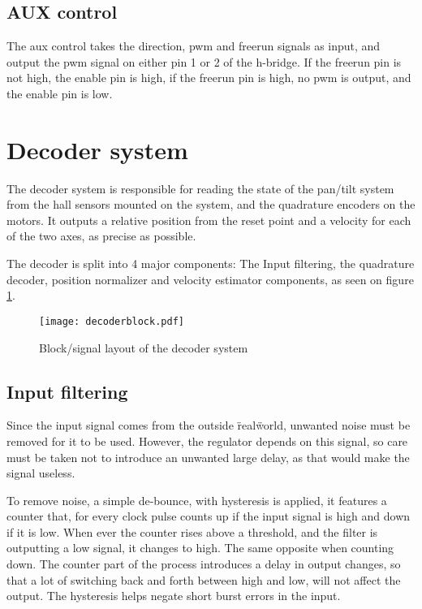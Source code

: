 \subsection{AUX control}
The aux control takes the direction, pwm and freerun signals as input, and output the pwm signal on either pin 1 or 2 of the h-bridge. If the freerun pin is not high, the enable pin is high, if the freerun pin is high, no pwm is output, and the enable pin is low.

\section{Decoder system}
The decoder system is responsible for reading the state of the pan/tilt system from the hall sensors mounted on the system, and the quadrature encoders on the motors. 
It outputs a relative position from the reset point and a velocity for each of the two axes, as precise as possible.

The decoder is split into 4 major components: The Input filtering, the quadrature decoder, position normalizer and velocity estimator components, as seen on figure \ref{fig:decoderblock}. 



\begin{figure}[htb]
\texttt{[image: decoderblock.pdf]}
\caption{Block/signal layout of the decoder system}
\label{fig:decoderblock}
\end{figure}


\subsection{Input filtering}
Since the input signal comes from the outside \"real\" world, unwanted noise must be removed for it to be used. However, the regulator depends on this signal, so care must be taken not to introduce an unwanted large delay, as that would make the signal  useless.

To remove noise, a simple de-bounce, with hysteresis is applied, it features a counter that, for every clock pulse counts up if the input signal is high and down if it is low.
When ever the counter rises above a threshold, and the filter is outputting a low signal, it changes to high. The same opposite when counting down.
The counter part of the process introduces a delay in output changes, so that a lot of switching back and forth between high and low, will not affect the output. The hysteresis helps negate short burst errors in the input. 

